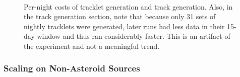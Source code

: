 \begin{figure}[ht!]
  \centering
  \\

  \caption[Compute costs for tracklet and track generation.]{Per-night costs of tracklet generation and track
    generation. Also, in the track generation section,
    note that because only 31 sets of nightly tracklets were
    generated, later runs had less data in their 15-day window and thus ran
    considerably faster.  This is an artifact of the experiment and
    not a meaningful trend.}
  \label{nightlyVariance}
\end{figure}


\subsubsection{Scaling on Non-Asteroid Sources}

